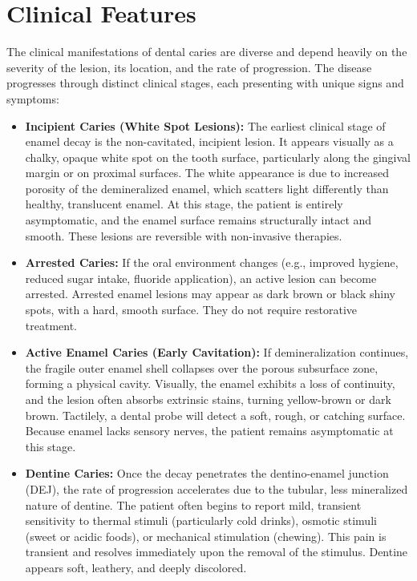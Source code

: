 \section*{Clinical Features}
The clinical manifestations of dental caries are diverse and depend heavily on the severity of the lesion, its location, and the rate of progression. The disease progresses through distinct clinical stages, each presenting with unique signs and symptoms:

\begin{itemize}
    \item \textbf{Incipient Caries (White Spot Lesions):} The earliest clinical stage of enamel decay is the non-cavitated, incipient lesion. It appears visually as a chalky, opaque white spot on the tooth surface, particularly along the gingival margin or on proximal surfaces. The white appearance is due to increased porosity of the demineralized enamel, which scatters light differently than healthy, translucent enamel. At this stage, the patient is entirely asymptomatic, and the enamel surface remains structurally intact and smooth. These lesions are reversible with non-invasive therapies.
    \item \textbf{Arrested Caries:} If the oral environment changes (e.g., improved hygiene, reduced sugar intake, fluoride application), an active lesion can become arrested. Arrested enamel lesions may appear as dark brown or black shiny spots, with a hard, smooth surface. They do not require restorative treatment.
    \item \textbf{Active Enamel Caries (Early Cavitation):} If demineralization continues, the fragile outer enamel shell collapses over the porous subsurface zone, forming a physical cavity. Visually, the enamel exhibits a loss of continuity, and the lesion often absorbs extrinsic stains, turning yellow-brown or dark brown. Tactilely, a dental probe will detect a soft, rough, or catching surface. Because enamel lacks sensory nerves, the patient remains asymptomatic at this stage.
    \item \textbf{Dentine Caries:} Once the decay penetrates the dentino-enamel junction (DEJ), the rate of progression accelerates due to the tubular, less mineralized nature of dentine. The patient often begins to report mild, transient sensitivity to thermal stimuli (particularly cold drinks), osmotic stimuli (sweet or acidic foods), or mechanical stimulation (chewing). This pain is transient and resolves immediately upon the removal of the stimulus. Dentine appears soft, leathery, and deeply discolored.

\end{itemize}
